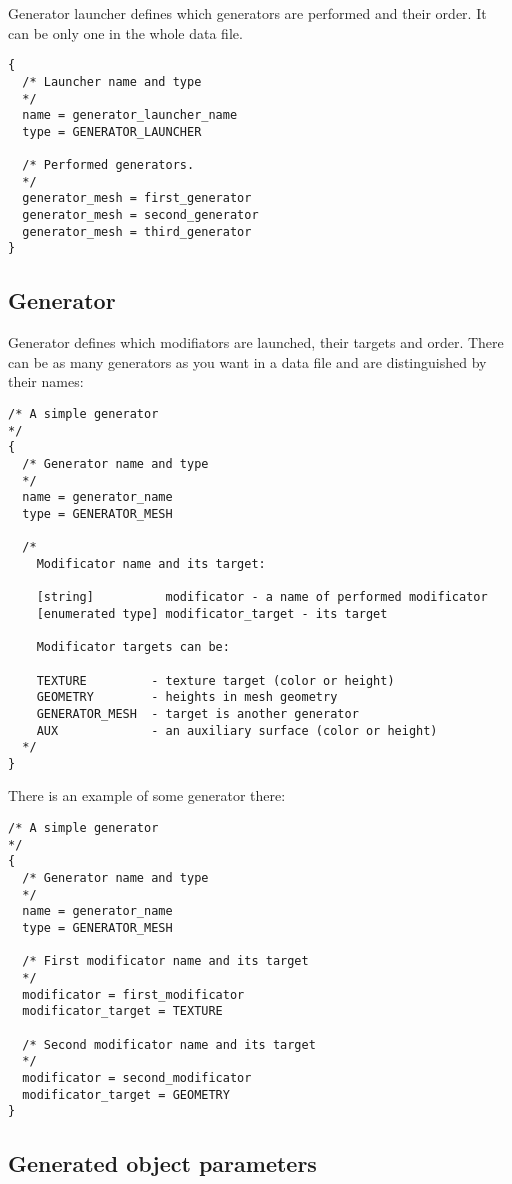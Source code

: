 \documentclass[11pt]{article}
\begin{document}
Generator launcher defines which generators are performed and their order. 
It can be only one in the whole data file.

\begin{verbatim}
{
  /* Launcher name and type
  */
  name = generator_launcher_name
  type = GENERATOR_LAUNCHER

  /* Performed generators. 
  */
  generator_mesh = first_generator
  generator_mesh = second_generator
  generator_mesh = third_generator
}
\end{verbatim}

\subsection{Generator}

Generator defines which modifiators are launched, their targets and order. 
There can be as many generators as you want in a data file and 
are distinguished by their names:

\begin{verbatim}
/* A simple generator
*/
{
  /* Generator name and type
  */
  name = generator_name
  type = GENERATOR_MESH

  /*
    Modificator name and its target:
    
    [string]          modificator - a name of performed modificator
    [enumerated type] modificator_target - its target
    
    Modificator targets can be:
    
    TEXTURE         - texture target (color or height)
    GEOMETRY        - heights in mesh geometry
    GENERATOR_MESH  - target is another generator
    AUX             - an auxiliary surface (color or height)
  */
}
\end{verbatim}

There is an example of some generator there: 

\begin{verbatim}
/* A simple generator
*/
{
  /* Generator name and type
  */
  name = generator_name
  type = GENERATOR_MESH

  /* First modificator name and its target
  */
  modificator = first_modificator
  modificator_target = TEXTURE
  
  /* Second modificator name and its target
  */
  modificator = second_modificator
  modificator_target = GEOMETRY
}
\end{verbatim}

\subsection{Generated object parameters}
\end{document}
